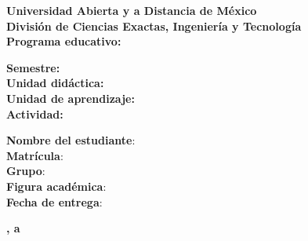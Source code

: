\begin{titlepage} %

	\centering %

	\vspace*{\baselineskip} %


	\vspace{3.75\baselineskip} %

	{\Huge\bfseries Universidad Abierta y a Distancia de México}\\ %
	\vspace{0.75\baselineskip} %
	{\LARGE \textbf{División de Ciencias Exactas, Ingeniería y Tecnología\\}} %
	\vspace{2\baselineskip} %
	{\LARGE \textbf{Programa educativo:} \textbf{\peducativo}} %

	\vspace{2\baselineskip} %

        \begin{minipage}[c]{.7\textwidth}
            \flushleft
            {\Large \textbf{Semestre:} \semestre\\}
            {\Large \textbf{Unidad didáctica:} \udidactica\\}
            {\Large \textbf{Unidad de aprendizaje:} \uaprendizaje\\}
            {\Large \textbf{Actividad:} \actividad\\}
        \end{minipage}

	\vspace{2\baselineskip} %

        \begin{minipage}[c]{.8\textwidth}
            \flushleft
            {\large \textbf{Nombre del estudiante}: \estudiante\\}
            {\large \textbf{Matrícula}: \matricula\\}
            {\large \textbf{Grupo}: \grupo\\}
            {\large \textbf{Figura académica}: \facademica\\}
            {\large \textbf{Fecha de entrega}: \fechaentrega\\}
        \end{minipage}

	\vspace{4\baselineskip} %
        {\Large \textbf{\ubicacion, a \fechaentrega}}


	\vspace*{3\baselineskip} %

	\vfill %

\end{titlepage}
